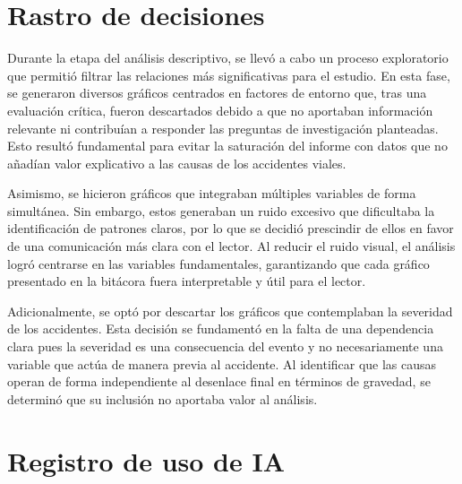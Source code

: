 \documentclass[12pt]{article}
\begin{document}
\section{Rastro de decisiones}
Durante la etapa del análisis descriptivo, se llevó a cabo un proceso exploratorio
que permitió filtrar las relaciones más significativas para 
el estudio. En esta fase, se generaron diversos gráficos centrados en factores de 
entorno que, tras una evaluación crítica, fueron descartados debido a que no 
aportaban información relevante ni contribuían a responder las preguntas de 
investigación planteadas. Esto resultó fundamental para evitar la 
saturación del informe con datos que no añadían valor explicativo a las causas 
de los accidentes viales.

Asimismo, se hicieron gráficos que integraban múltiples 
variables de forma simultánea. Sin embargo, estos generaban un 
ruido excesivo que dificultaba la identificación de patrones claros, por lo que 
se decidió prescindir de ellos en favor de una comunicación más clara con el lector. 
Al reducir el ruido visual, el análisis logró centrarse en las variables 
fundamentales, garantizando que cada gráfico presentado en la bitácora fuera 
interpretable y útil para el lector.

Adicionalmente, se optó por descartar los gráficos que contemplaban la severidad de los accidentes. 
Esta decisión se fundamentó en la falta de una dependencia clara pues la severidad es una consecuencia del evento y no necesariamente 
una variable que actúa de manera previa al accidente. 
Al identificar que las causas operan de forma independiente al 
desenlace final en términos de gravedad, se determinó que su inclusión no aportaba 
valor al análisis.

\section{Registro de uso de IA}
\end{document}
